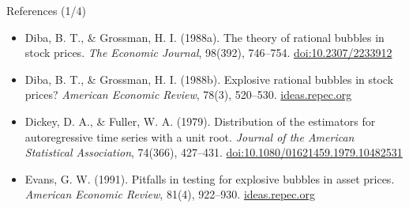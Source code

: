 \begin{frame}{References (1/4)}
\begin{itemize}
    \item Diba, B. T., \& Grossman, H. I. (1988a). The theory of rational bubbles in stock prices. \textit{The Economic Journal}, 98(392), 746--754. \href{https://doi.org/10.2307/2233912}{doi:10.2307/2233912}
    \item Diba, B. T., \& Grossman, H. I. (1988b). Explosive rational bubbles in stock prices? \textit{American Economic Review}, 78(3), 520--530. \href{https://ideas.repec.org/a/aea/aecrev/v78y1988i3p520-30.html}{ideas.repec.org}
    \item Dickey, D. A., \& Fuller, W. A. (1979). Distribution of the estimators for autoregressive time series with a unit root. \textit{Journal of the American Statistical Association}, 74(366), 427--431. \href{https://doi.org/10.1080/01621459.1979.10482531}{doi:10.1080/01621459.1979.10482531}
    \item Evans, G. W. (1991). Pitfalls in testing for explosive bubbles in asset prices. \textit{American Economic Review}, 81(4), 922--930. \href{https://ideas.repec.org/a/aea/aecrev/v81y1991i4p922-30.html}{ideas.repec.org}
\end{itemize}
\end{frame}

